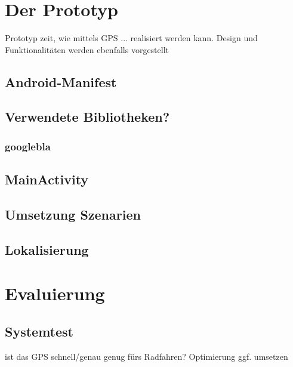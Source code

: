\chapter{\label{chap:implementierung}Der Prototyp}
Prototyp zeit, wie mittels GPS ... realisiert werden kann.
Design und Funktionalitäten werden ebenfalls vorgestellt
\section{Android-Manifest}
\section{Verwendete Bibliotheken?}
\subsection{googlebla}
\section{MainActivity}
\section{Umsetzung Szenarien}
\section{Lokalisierung}
%
%
\chapter{Evaluierung}
\section{Systemtest}
ist das GPS schnell/genau genug fürs Radfahren?
Optimierung ggf. umsetzen
